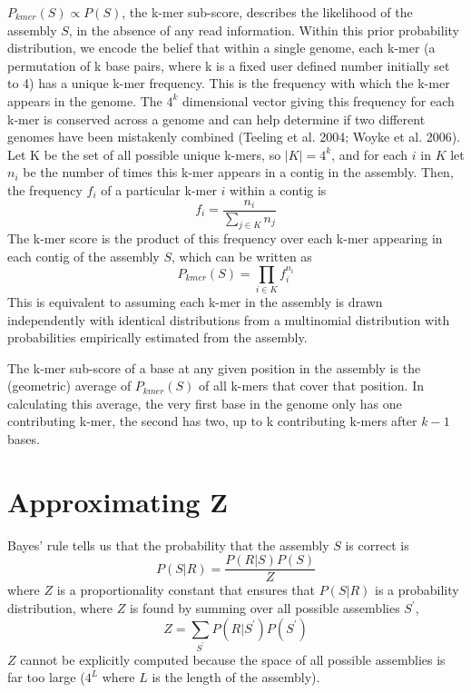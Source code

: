 \documentclass[phd,tocprelim]{cornell}
\begin{document}
$P_{kmer}(S) \propto P(S)$, the k-mer sub-score, describes the likelihood of the assembly $S$, in the absence of any read information.  Within this prior probability distribution, we encode the belief that within a single genome, each k-mer (a permutation of k base pairs, where k is a fixed user defined number initially set to 4) has a unique k-mer frequency. This is the frequency with which the k-mer appears in the genome.  The $4^{k}$ dimensional vector giving this frequency for each k-mer is conserved across a genome and can help determine if two different genomes have been mistakenly combined (Teeling et al. 2004; Woyke et al. 2006). Let K be the set of all possible unique k-mers, so $|K| = 4^{k}$, and for each $i$ in $K$ let $n_{i}$ be the number of times this k-mer appears in a contig in the assembly. Then, the frequency $f_{i}$ of a particular k-mer $i$ within a contig is
\begin{equation}
    f_{i} = \frac{n_{i}}{\sum_{j\in K}n_{j}}
\end{equation}
The k-mer score is the product of this frequency over each k-mer appearing in each contig of the assembly $S$, which can be written as
\begin{equation}
    P_{kmer}(S) = \prod_{i\in K} f_{i}^{n_{i}}
\end{equation}
This is equivalent to assuming each k-mer in the assembly is drawn independently with identical distributions from a multinomial distribution with probabilities empirically estimated from the assembly.

The k-mer sub-score of a base at any given position in the assembly is the (geometric) average of $P_{kmer}(S)$ of all k-mers that cover that position. In calculating this average, the very first base in the genome only has one contributing k-mer, the second has two, up to k contributing k-mers after $k-1$ bases.



\section{Approximating Z} %
\label{sec:Approximating Z}

Bayes’ rule tells us that the probability that the assembly $S$ is correct is
\begin{equation}
    P(S|R) = \frac{P(R|S)P(S)}{Z}
\end{equation}
where $Z$ is a proportionality constant that ensures that $P(S|R)$ is a probability distribution, where $Z$ is found by summing over all possible assemblies $S^{\prime}$,
\begin{equation}
    Z = \sum_{S^{\prime}}P(R|S^{\prime})P(S^{\prime})
\end{equation}
$Z$ cannot be explicitly computed because the space of all possible assemblies is far too large ($4^{L}$ where $L$ is the length of the assembly). 
\end{document}
